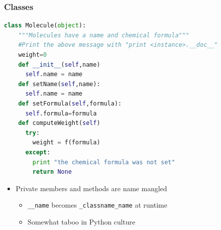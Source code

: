 \documentclass[xcolor=table,10pt,final]{beamer}
\begin{document}
\begin{frame}
\end{frame}


\begin{frame}[fragile]
  \frametitle{Classes}
  \begin{lstlisting}[language=python]
  class Molecule(object):
    """Molecules have a name and chemical formula"""
    #Print the above message with "print <instance>.__doc__"
    weight=0
    def __init__(self,name)
      self.name = name
    def setName(self,name):
      self.name = name
    def setFormula(self,formula):
      self.formula=formula
    def computeWeight(self)
      try:
        weight = f(formula)
      except:
        print "the chemical formula was not set"
        return None
   \end{lstlisting}
   \begin{itemize}
     \item Private members and methods are name mangled
       \begin{itemize}
         \item \lstinline[language=python]|__name| becomes \lstinline[language=python]|_classname_name| at runtime
         \item Somewhat taboo in Python culture
       \end{itemize}
   \end{itemize}
\end{frame}
\end{document}
